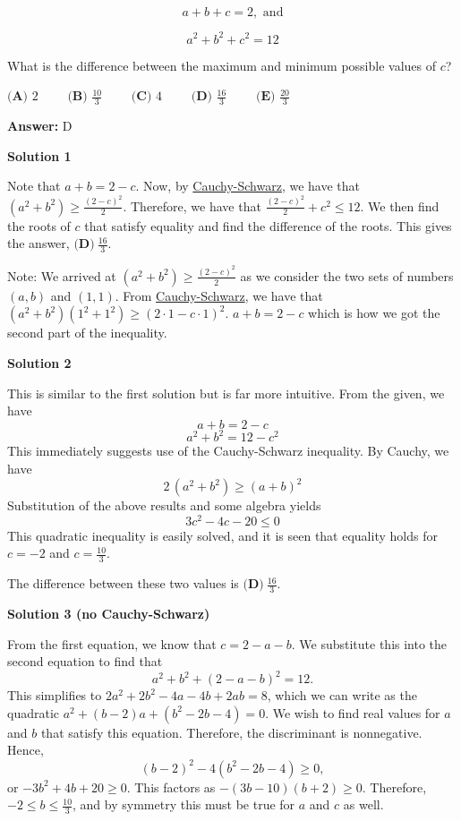 \begin{enumerate}
 
 \[a+b+c=2, \text{ and}\]

 \[a^2+b^2+c^2=12\]


 What is the difference between the maximum and minimum possible values of $c$?


 $\textbf{(A) }2\qquad \textbf{ (B) }\frac{10}{3}\qquad \textbf{ (C) }4 \qquad \textbf{ (D) }\frac{16}{3}\qquad \textbf{ (E) }\frac{20}{3}$

 \textbf{Answer: }D



\textbf{Solution 1}

Note that $a+b= 2-c$. Now, by \href{https://artofproblemsolving.com/wiki/index.php?title=Cauchy-Schwarz}{Cauchy-Schwarz}, we have that $(a^2+b^2) \ge \frac{(2-c)^2}{2}$. Therefore, we have that $\frac{(2-c)^2}{2}+c^2 \le 12$. We then find the roots of $c$ that satisfy equality and find the difference of the roots. This gives the answer, $\boxed{\textbf{(D)} \ \frac{16}{3}}$.

 Note: We arrived at $(a^2+b^2) \ge \frac{(2-c)^2}{2}$ as we consider the two sets of numbers $(a,b)$ and $(1,1)$. From \href{https://artofproblemsolving.com/wiki/index.php?title=Cauchy-Schwarz}{Cauchy-Schwarz}, we have that $(a^2+b^2)(1^2+1^2) \ge (2\cdot 1 -c\cdot 1)^2$. $a+b = 2-c$ which is how we got the second part of the inequality.

 



\textbf{Solution 2}

This is similar to the first solution but is far more intuitive. From the given, we have 
 \[a + b = 2 - c\] 
 \[a^2 + b^2 = 12 - c^2\] This immediately suggests use of the Cauchy-Schwarz inequality. By Cauchy, we have 
 \[2\,(a^2 + b^2) \geq (a + b)^2\] Substitution of the above results and some algebra yields 
 \[3c^2 - 4c - 20 \leq 0\] This quadratic inequality is easily solved, and it is seen that equality holds for $c = -2$ and $c = \frac{10}{3}$. 

 The difference between these two values is  $\boxed{\textbf{(D)} \ \frac{16}{3}}$.

 



\textbf{Solution 3 (no Cauchy-Schwarz)}

From the first equation, we know that $c=2-a-b$. We substitute this into the second equation to find that
 \[a^2+b^2+(2-a-b)^2=12.\]This simplifies to $2a^2+2b^2-4a-4b+2ab=8$, which we can write as the quadratic $a^2+(b-2)a+(b^2-2b-4)=0$. We wish to find real values for $a$ and $b$ that satisfy this equation. Therefore, the discriminant is nonnegative. Hence,
 \[(b-2)^2-4(b^2-2b-4)\ge0,\]or $-3b^2+4b+20\ge 0$. This factors as $-(3b-10)(b+2)\ge 0$. Therefore, $-2\le b\le \frac{10}{3}$, and by symmetry this must be true for $a$ and $c$ as well.


\end{enumerate}

